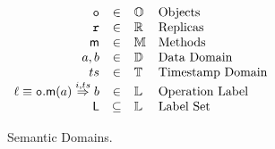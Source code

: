 \begin{wrapfigure}{r}{0.5\linewidth}
\vspace{-4mm}
  \centering
  \(
  \begin{array}[t]{rcll}
    \mathtt{o} & \in  & \mathbb{O} & \text{Objects} \\
    \mathtt{r} & \in & \mathbb{R} & \text{Replicas} \\
    \mathsf{m} & \in & \mathbb{M} & \text{Methods}\\
    a, b & \in & \mathbb{D} & \text{Data Domain} \\
    ts & \in & \mathbb{T} & \text{Timestamp Domain} \\
    \ell \equiv {{\ensuremath{\mathtt{o}}.\ensuremath{\mathsf{m}}}}(a) \overset{i,ts}{\Rightarrow} b & \in & \mathbb{L} & \text{Operation Label} \\
    \mathsf{L} & \subseteq & \mathbb{L} & \text{Label Set}\\
  \end{array}
  \)
  \caption{Semantic Domains.}
  \label{fig:sem-dom}
\end{wrapfigure}

